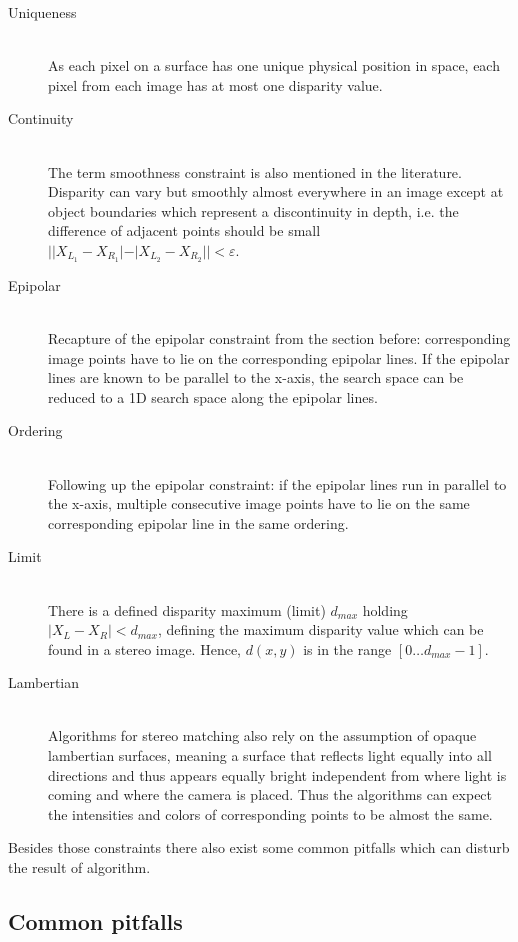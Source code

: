\begin{description}
  \item[Uniqueness] \hfill \\ As each pixel on a surface has one unique physical position in space, each pixel from each image has at most one disparity value.
  \item[Continuity] \hfill \\ The term smoothness constraint is also mentioned in the literature. Disparity can vary but smoothly almost everywhere in an image except at object boundaries which represent a discontinuity in depth, i.e. the difference of adjacent points should be small $||X_{L_1} - X_{R_1}| - |X_{L_2} - X_{R_2}|| < \varepsilon$.
  \item[Epipolar] \hfill \\ Recapture of the epipolar constraint from the section before: corresponding image points have to lie on the corresponding epipolar lines. If the epipolar lines are known to be parallel to the x-axis, the search space can be reduced to a 1D search space along the epipolar lines.
  \item[Ordering] \hfill \\ Following up the epipolar constraint: if the epipolar lines run in parallel to the x-axis, multiple consecutive image points have to lie on the same corresponding epipolar line in the same ordering.
  \item[Limit] \hfill \\ There is a defined disparity maximum (limit) $d_{max}$ holding $|X_L - X_R| < d_{max}$, defining the maximum disparity value which can be found in a stereo image. Hence, $d(x,y)$ is in the range $[0 \dots d_{max} - 1]$.
  \item[Lambertian] \hfill \\ Algorithms for stereo matching also rely on the assumption of opaque lambertian surfaces, meaning a surface that reflects light equally into all directions and thus appears equally bright independent from where light is coming and where the camera is placed. Thus the algorithms can expect the intensities and colors of corresponding points to be almost the same.
\end{description}

\noindent Besides those constraints there also exist some common pitfalls which can disturb the result of algorithm.

\subsection*{Common pitfalls}

